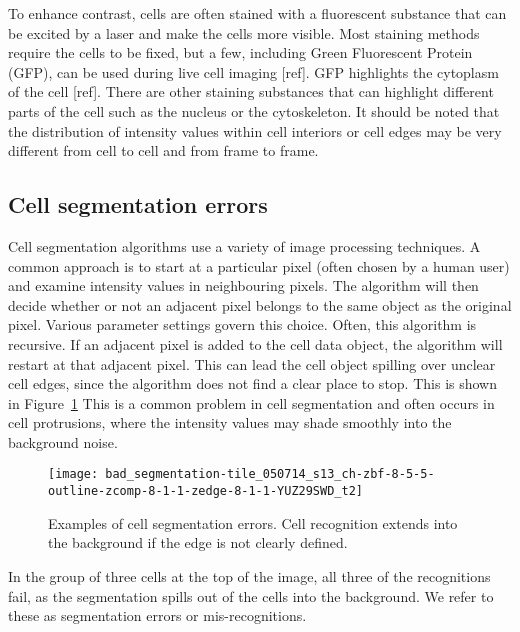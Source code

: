 To enhance contrast, cells are often stained with a fluorescent substance that can be excited by a laser and make the cells more visible. Most staining methods require the cells to be fixed, but a few, including Green Fluorescent Protein (GFP), can be used during live cell imaging [ref]. GFP highlights the cytoplasm of the cell [ref]. There are other staining substances that can highlight different parts of the cell such as the nucleus or the cytoskeleton. It should be noted that the distribution of intensity values within cell interiors or cell edges may be very different from cell to cell and from frame to frame.

\subsection{Cell segmentation errors}

Cell segmentation algorithms use a variety of image processing techniques. A common approach is to start at a particular pixel (often chosen by a human user) and examine intensity values in neighbouring pixels. The algorithm will then decide whether or not an adjacent pixel belongs to the same object as the original pixel. Various parameter settings govern this choice. Often, this algorithm is recursive. If an adjacent pixel is added to the cell data object, the algorithm will restart at that adjacent pixel. This can lead the cell object spilling over unclear cell edges, since the algorithm does not find a clear place to stop. This is shown in Figure~\ref{fig:cell_segmentation_errors} This is a common problem in cell segmentation and often occurs in cell protrusions, where the intensity values may shade smoothly into the background noise.

\begin{figure}[htbp!]
\centering
\texttt{[image: bad\_segmentation-tile\_050714\_s13\_ch-zbf-8-5-5-outline-zcomp-8-1-1-zedge-8-1-1-YUZ29SWD\_t2]}
\caption[Cell segmentation error examples]{Examples of cell segmentation errors. Cell recognition extends into the background if the edge is not clearly defined.}
\label{fig:cell_segmentation_errors}
\end{figure}

In the group of three cells at the top of the image, all three of the recognitions fail, as the segmentation spills out of the cells into the background. We refer to these as segmentation errors or mis-recognitions.

